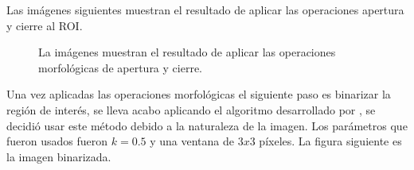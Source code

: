 Las imágenes siguientes muestran el resultado de aplicar las operaciones apertura y cierre al ROI. 
\begin{figure}[h!]
\begin{center} 
   \qquad
{}  
\end{center}
\caption{La imágenes muestran el resultado de aplicar las operaciones morfológicas de apertura y cierre.}
\label{fig:HandNoNoises}
\end{figure}  

Una vez aplicadas las operaciones morfológicas el siguiente paso es binarizar la región de interés, se lleva acabo aplicando el algoritmo desarrollado por \citep{Niblack1985}, se decidió usar este método debido a la naturaleza de la imagen. Los parámetros que fueron usados fueron $k=0.5$ y una ventana de $3x3$ p\'ixeles. La figura siguiente es la imagen binarizada. 

